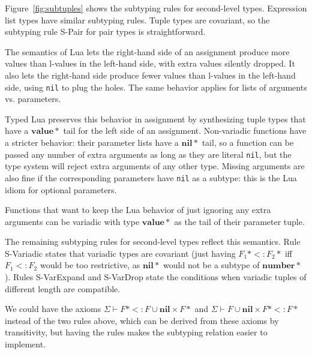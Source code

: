 \documentclass[preprint]{sigplanconf}
\newcommand{\Value}{\mathbf{value}}
\newcommand{\Nil}{\mathbf{nil}}
\newcommand{\Number}{\mathbf{number}}
\newcommand{\senv}{\Sigma}
\newcommand{\subtype}{<:}
\begin{document}
Figure~\ref{fig:subtuples} shows the subtyping rules for
second-level types. Expression list types have similar
subtyping rules. Tuple types are covariant, so the subtyping rule {\sc S-Pair} for pair types is straightforward.

The semantics of Lua lets the right-hand side of an assignment
produce more values than l-values in the left-hand side,
with extra values silently dropped. It also lets the
right-hand side produce fewer values than l-values in the
left-hand side, using {\tt nil} to plug the holes. The
same behavior applies for lists of arguments vs. parameters.

Typed Lua preserves this behavior in assignment by synthesizing
tuple types that have a $\Value{*}$ tail for the left side
of an assignment. Non-variadic functions have a stricter
behavior: their parameter lists have a $\Nil{*}$ tail, so
a function can be passed any number of extra arguments
as long as they are literal {\tt nil}, but the type system will
reject extra arguments of any other type. Missing arguments
are also fine if the corresponding parameters have {\tt nil}
as a subtype: this is the Lua idiom for optional parameters.

Functions that want to keep the Lua behavior of just ignoring
any extra arguments can be variadic with type $\Value{*}$ as
the tail of their parameter tuple.

The remaining subtyping rules for second-level types
reflect this semantics. Rule {\sc S-Variadic} states
that variadic types are covariant (just having $F_1{*} \subtype F_2{*}$ iff $F_1 \subtype F_2$ would be too restrictive,
as $\Nil{*}$ would not be a subtype of $\Number{*}$).
Rules {\sc S-VarExpand} and {\sc S-VarDrop} state the
conditions when variadic tuples of different length are
compatible.

We could have the axioms $\senv \vdash F{*} \subtype F \cup \Nil \times F{*}$ and $\senv \vdash F \cup \Nil \times F{*}  \subtype F{*}$ instead of the two rules above, which can be derived
from these axioms by transitivity, but having the rules makes
the subtyping relation easier to implement.
\end{document}
